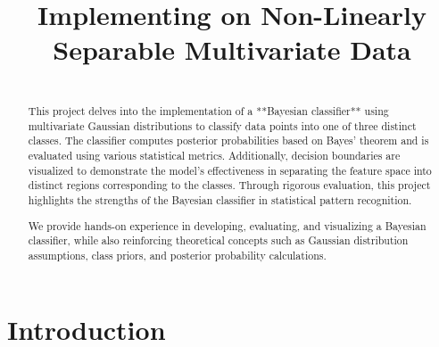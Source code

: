 \documentclass[conference]{IEEEtran}
\begin{document}
	\title{Implementing on Non-Linearly Separable Multivariate Data
	}
	
	\author{
		\and
		\and
	}
	
	\maketitle
	
	\begin{abstract}
		\\
		This project delves into the implementation of a **Bayesian classifier** using multivariate Gaussian distributions to classify data points into one of three distinct classes. The classifier computes posterior probabilities based on Bayes' theorem and is evaluated using various statistical metrics. Additionally, decision boundaries are visualized to demonstrate the model's effectiveness in separating the feature space into distinct regions corresponding to the classes. Through rigorous evaluation, this project highlights the strengths of the Bayesian classifier in statistical pattern recognition.
		
		We provide hands-on experience in developing, evaluating, and visualizing a Bayesian classifier, while also reinforcing theoretical concepts such as Gaussian distribution assumptions, class priors, and posterior probability calculations.
	\end{abstract}
	
	\section{Introduction}
	
\end{document}
